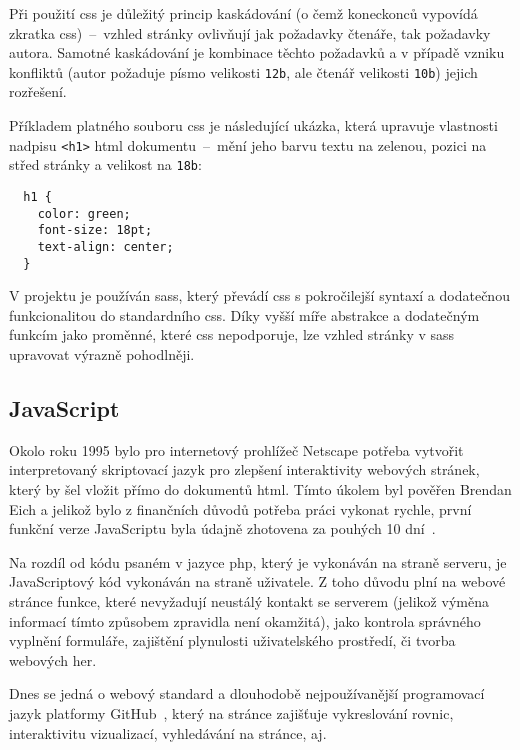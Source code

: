 \documentclass[a4paper, 12pt]{article}
\begin{document}
  Při použití \gls{css} je důležitý princip kaskádování (o čemž koneckonců vypovídá zkratka \gls{css})~--~vzhled stránky ovlivňují jak požadavky čtenáře, tak požadavky autora. Samotné kaskádování je kombinace těchto požadavků a v případě vzniku konfliktů (autor požaduje písmo velikosti \texttt{12b}, ale čtenář velikosti \texttt{10b}) jejich rozřešení.

  Příkladem platného souboru \gls{css} je následující ukázka, která upravuje vlastnosti nadpisu \texttt{<h1>} \gls{html} dokumentu~--~mění jeho barvu textu na zelenou, pozici na střed stránky a velikost na \texttt{18b}:

  \begin{verbatim}
  h1 {
    color: green;
    font-size: 18pt;
    text-align: center;
  }
  \end{verbatim}

  V projektu je používán \gls{sass}, který převádí \gls{css} s pokročilejší syntaxí a dodatečnou funkcionalitou do standardního \gls{css}. Díky vyšší míře abstrakce a dodatečným funkcím jako proměnné, které \gls{css} nepodporuje, lze vzhled stránky v \gls{sass} upravovat výrazně pohodlněji.


  \subsection{JavaScript} \label{sec:JavaScript}
  Okolo roku 1995 bylo pro internetový prohlížeč Netscape potřeba vytvořit interpretovaný skriptovací jazyk pro zlepšení interaktivity webových stránek, který by šel vložit přímo do dokumentů \gls{html}. Tímto úkolem byl pověřen Brendan Eich a jelikož bylo z finančních důvodů potřeba práci vykonat rychle, první funkční verze JavaScriptu byla údajně zhotovena za pouhých 10 dní~\cite{the-origin-of-javascript}.

  Na rozdíl od kódu psaném v jazyce \gls{php}, který je vykonáván na straně serveru, je JavaScriptový kód vykonáván na straně uživatele. Z toho důvodu plní na webové stránce funkce, které nevyžadují neustálý kontakt se serverem (jelikož výměna informací tímto způsobem zpravidla není okamžitá), jako kontrola správného vyplnění formuláře, zajištění plynulosti uživatelského prostředí, či tvorba webových her.

  Dnes se jedná o webový standard a dlouhodobě nejpoužívanější programovací jazyk platformy GitHub~\cite{github-statistics}, který na stránce zajišťuje vykreslování rovnic, interaktivitu vizualizací, vyhledávání na stránce, aj.
\end{document}
